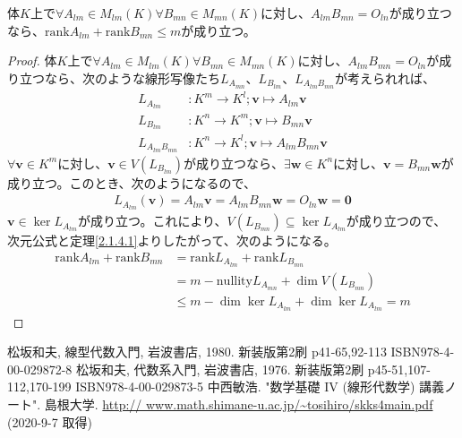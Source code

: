 \documentclass[dvipdfmx]{jsarticle}
\begin{document}
\begin{thm}\label{2.1.4.16}
体$K$上で$\forall A_{lm} \in M_{lm}(K)\forall B_{mn} \in M_{mn}(K)$に対し、$A_{lm}B_{mn} = O_{ln}$が成り立つなら、${\mathrm{rank} }A_{lm} + {\mathrm{rank} }B_{mn} \leq m$が成り立つ。
\end{thm}
\begin{proof}
体$K$上で$\forall A_{lm} \in M_{lm}(K)\forall B_{mn} \in M_{mn}(K)$に対し、$A_{lm}B_{mn} = O_{ln}$が成り立つなら、次のような線形写像たち$L_{A_{mn}}$、$L_{B_{lm}}$、$L_{A_{lm}B_{mn}}$が考えられれば、
\begin{align*}
L_{A_{lm}}&:K^{m} \rightarrow K^{l};\mathbf{v} \mapsto A_{lm}\mathbf{v}\\
L_{B_{lm}}&:K^{n} \rightarrow K^{m};\mathbf{v} \mapsto B_{mn}\mathbf{v}\\
L_{A_{lm}B_{mn}}&:K^{n} \rightarrow K^{l};\mathbf{v} \mapsto A_{lm}B_{mn}\mathbf{v}
\end{align*}
$\forall\mathbf{v} \in K^{m}$に対し、$\mathbf{v} \in V\left( L_{B_{lm}} \right)$が成り立つなら、$\exists\mathbf{w} \in K^{n}$に対し、$\mathbf{v} = B_{mn}\mathbf{w}$が成り立つ。このとき、次のようになるので、
\begin{align*}
L_{A_{lm}}\left( \mathbf{v} \right) = A_{lm}\mathbf{v} = A_{lm}B_{mn}\mathbf{w} = O_{ln}\mathbf{w} = \mathbf{0}
\end{align*}
$\mathbf{v} \in \ker L_{A_{lm}}$が成り立つ。これにより、$V\left( L_{B_{mn}} \right) \subseteq \ker L_{A_{lm}}$が成り立つので、次元公式と定理\ref{2.1.4.1}よりしたがって、次のようになる。
\begin{align*}
{\mathrm{rank} }A_{lm} + {\mathrm{rank} }B_{mn} &= {\mathrm{rank} }L_{A_{lm}} + {\mathrm{rank} }L_{B_{mn}}\\
&= m - {\mathrm{nullity}}L_{A_{mn}} + \dim{V\left( L_{B_{mn}} \right)}\\
&\leq m - \dim{\ker L_{A_{lm}}} + \dim{\ker L_{A_{lm}}} = m
\end{align*}
\end{proof}
\begin{thebibliography}{50}
    松坂和夫, 線型代数入門, 岩波書店, 1980. 新装版第2刷 p41-65,92-113 ISBN978-4-00-029872-8
    松坂和夫, 代数系入門, 岩波書店, 1976. 新装版第2刷 p45-51,107-112,170-199 ISBN978-4-00-029873-5
    中西敏浩. "数学基礎 IV (線形代数学) 講義ノート". 島根大学. \url{http:// www.math.shimane-u.ac.jp/~tosihiro/skks4main.pdf} (2020-9-7 取得)
\end{thebibliography}
\end{document}

